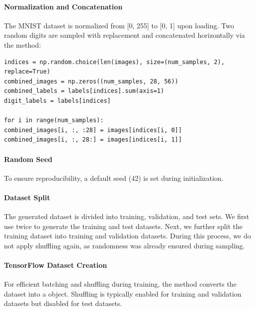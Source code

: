 \documentclass{article}
\begin{document}
\paragraph{Normalization and Concatenation} The MNIST dataset is normalized from [0, 255] to [0, 1] upon loading. Two random digits are sampled with replacement and concatenated horizontally via the  method:

\begin{lstlisting}[style=pythonstyle, caption=Code snippet for \inlinecode{\_combine\_images}]
indices = np.random.choice(len(images), size=(num_samples, 2), replace=True)
combined_images = np.zeros((num_samples, 28, 56))
combined_labels = labels[indices].sum(axis=1)
digit_labels = labels[indices]

for i in range(num_samples):
combined_images[i, :, :28] = images[indices[i, 0]]
combined_images[i, :, 28:] = images[indices[i, 1]]
\end{lstlisting}


\paragraph{Random Seed}
To ensure reproducibility, a default seed (42) is set during initialization.

\paragraph{Dataset Split}

The generated dataset is divided into training, validation, and test sets. We first use  twice to generate the training and test datasets. Next, we further split the training dataset into training and validation datasets. During this process, we do not apply shuffling again, as randomness was already ensured during sampling.

\label{para:tfdataset}
\paragraph{TensorFlow Dataset Creation}
For efficient batching and shuffling during training, the  method converts the dataset into a  object. Shuffling is typically enabled for training and validation datasets but disabled for test datasets.
\end{document}
